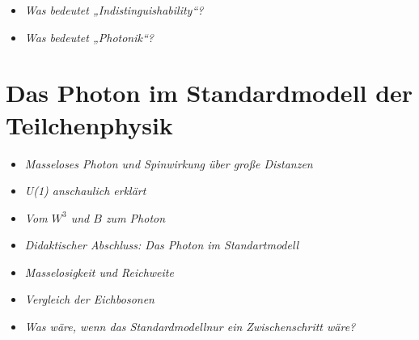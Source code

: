 \vspace{1em}
\begin{tcolorbox}[title=Hinweisboxen, hinweisbox]
	\begin{itemize}
		\item \emph{Was bedeutet „Indistinguishability“?} \dotfill\pageref{box:indistinguishability}
		\item \emph{Was bedeutet „Photonik“?} \dotfill\pageref{box:photonics_definition}
	\end{itemize}
\end{tcolorbox}
\section{Das Photon im Standardmodell der Teilchenphysik}
\vspace{1em}

\begin{tcolorbox}[title=physikalische Boxen, physikbox]
	\begin{itemize}
		\item \emph{Masseloses Photon und Spinwirkung über große Distanzen}\dotfill\pageref{box:photon_spin_reichweite}
	\end{itemize}
\end{tcolorbox}

\vspace{1em}
\begin{tcolorbox}[title=didaktische Boxen, didaktikbox]
	\begin{itemize}
		\item \emph{U(1) anschaulich erklärt} \dotfill\pageref{box:u1_kreis}
		\item \emph{Vom \(W^3\) und \(B\) zum Photon} \dotfill\pageref{box:weinberg_mischung}
		\item \emph{Didaktischer Abschluss: Das Photon \newline im Standartmodell} \dotfill\pageref{box:didaktik_kapVIII}
	\end{itemize}
\end{tcolorbox}

\vspace{1em}
\begin{tcolorbox}[title=Hinweisboxen, hinweisbox]
	\begin{itemize}
		\item \emph{Masselosigkeit und Reichweite} \dotfill\pageref{box:reichweite_masselos}
		\item \emph{Vergleich der Eichbosonen} \dotfill\pageref{box:eichbosonen_vergleich}
	\end{itemize}


\end{tcolorbox}
\begin{tcolorbox}[title=hypothetische Boxen, hypobox]
	\begin{itemize}
		
		\item \emph{Was wäre, wenn das Standardmodell\newline nur ein Zwischenschritt wäre?} \dotfill\pageref{Merksatz zum Photon}
	\end{itemize}
\end{tcolorbox}
